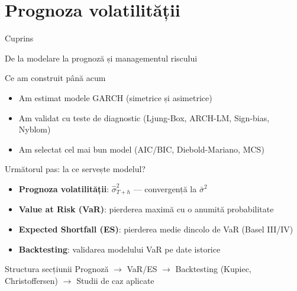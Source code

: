 \documentclass[9pt, aspectratio=169, t]{beamer}
\begin{document}
\section{Prognoza volatilității}

\begin{frame}{Cuprins}
    \small
    \vspace{-0.2cm}
    \tableofcontents[currentsection]
\end{frame}

\begin{frame}{De la modelare la prognoză și managementul riscului}
    \small
        \begin{block}{Ce am construit până acum}
            \begin{itemize}
                \item Am estimat modele GARCH (simetrice și asimetrice)
                \item Am validat cu teste de diagnostic (Ljung-Box, ARCH-LM, Sign-bias, Nyblom)
                \item Am selectat cel mai bun model (AIC/BIC, Diebold-Mariano, MCS)
            \end{itemize}
        \end{block}
        \vspace{-0.1cm}
        \begin{alertblock}{Următorul pas: la ce servește modelul?}
            \begin{itemize}
                \item \textbf{Prognoza volatilității}: $\hat{\sigma}_{T+h}^2$ --- convergență la $\bar{\sigma}^2$
                \item \textbf{Value at Risk (VaR)}: pierderea maximă cu o anumită probabilitate
                \item \textbf{Expected Shortfall (ES)}: pierderea medie dincolo de VaR (Basel III/IV)
                \item \textbf{Backtesting}: validarea modelului VaR pe date istorice
            \end{itemize}
        \end{alertblock}
        \vspace{-0.1cm}
        \begin{exampleblock}{Structura secțiunii}
            Prognoză $\rightarrow$ VaR/ES $\rightarrow$ Backtesting (Kupiec, Christoffersen) $\rightarrow$ Studii de caz aplicate
        \end{exampleblock}
\end{frame}
\end{document}
